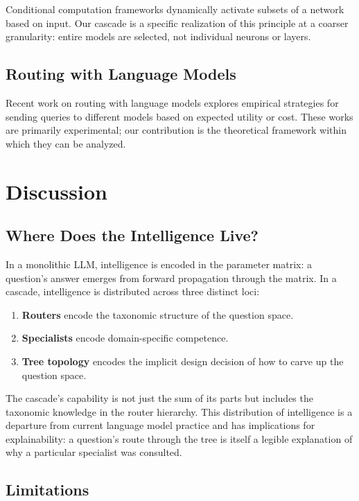 \documentclass[11pt,twocolumn,a4paper]{article}
\theoremstyle{definition}
\theoremstyle{remark}
\begin{document}
Conditional computation frameworks \citep{bengio2013estimating, bengio2015conditional} dynamically activate subsets of a network based on input. Our cascade is a specific realization of this principle at a coarser granularity: entire models are selected, not individual neurons or layers.

\subsection{Routing with Language Models}

Recent work on routing with language models \citep{ravaut2022hierarchical, chen2023frugalgpt, shnitzer2023large} explores empirical strategies for sending queries to different models based on expected utility or cost. These works are primarily experimental; our contribution is the theoretical framework within which they can be analyzed.

\section{Discussion}
\label{sec:discussion}

\subsection{Where Does the Intelligence Live?}

In a monolithic LLM, intelligence is encoded in the parameter matrix: a question's answer emerges from forward propagation through the matrix. In a cascade, intelligence is distributed across three distinct loci:
\begin{enumerate}
    \item \textbf{Routers} encode the taxonomic structure of the question space.
    \item \textbf{Specialists} encode domain-specific competence.
    \item \textbf{Tree topology} encodes the implicit design decision of how to carve up the question space.
\end{enumerate}

The cascade's capability is not just the sum of its parts but includes the taxonomic knowledge in the router hierarchy. This distribution of intelligence is a departure from current language model practice and has implications for explainability: a question's route through the tree is itself a legible explanation of why a particular specialist was consulted.

\subsection{Limitations}
\end{document}
